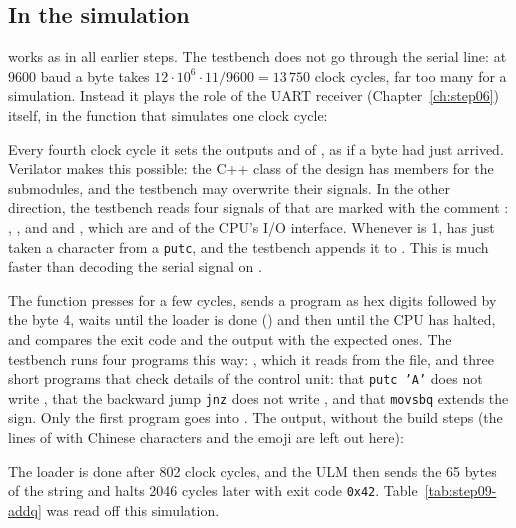 \subsection*{In the simulation}

 works as in all earlier steps. The testbench 
does not go through the serial line: at 9600 baud a byte takes $12\cdot10^6
\cdot 11 / 9600 = 13\,750$ clock cycles, far too many for a simulation.
Instead it plays the role of the UART receiver (Chapter~\ref{ch:step06})
itself, in the function that simulates one clock cycle:


Every fourth clock cycle it sets the outputs  and 
of , as if a byte had just arrived. Verilator makes this
possible: the C++ class of the design has members for the submodules, and the
testbench may overwrite their signals. In the other direction, the testbench
reads four signals of  that are marked with the comment
: , , and
 and , which are  and
 of the CPU's I/O interface. Whenever  is 1,
 has just taken a character from a \texttt{putc}, and the
testbench appends it to . This is much faster than decoding the
serial signal on .

The function  presses  for a few cycles, sends a program as
hex digits followed by the byte 4, waits until the loader is done
() and then until the CPU has halted, and compares the exit code and
the output with the expected ones. The testbench runs four programs this way:
, which it reads from the file, and three short
programs that check details of the control unit: that \texttt{putc 'A'} does
not write , that the backward jump \texttt{jnz} does not write
, and that \texttt{movsbq} extends the sign. Only the first program
goes into . The output, without the build steps (the lines
of  with Chinese characters and the emoji are left out here):


The loader is done after 802 clock cycles, and the ULM then sends the 65
bytes of the string and halts 2046 cycles later with exit code
\texttt{0x42}. Table~\ref{tab:step09-addq} was read off this simulation.

